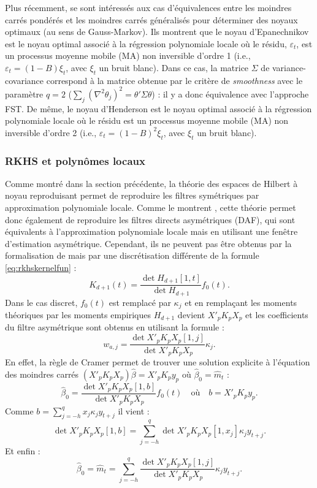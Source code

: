 \documentclass[
  12pt,
  french,
  12pt,a4paper]{article}
\newcommand\1{\mathds{1}}
\begin{document}
Plus récemment, \textcite{LuatiProietti2011} se sont intéressés aux cas d'équivalences entre les moindres carrés pondérés et les moindres carrés généralisés pour déterminer des noyaux optimaux (au sens de Gauss-Markov).
Ils montrent que le noyau d'Epanechnikov est le noyau optimal associé à la régression polynomiale locale où le résidu, \(\varepsilon_t\), est un processus moyenne mobile (MA) non inversible d'ordre 1 (i.e., \(\varepsilon_t=(1-B)\xi_t\), avec \(\xi_t\) un bruit blanc).
Dans ce cas, la matrice \(\Sigma\) de variance-covariance correspond à la matrice obtenue par le critère de \emph{smoothness} avec le paramètre \(q=2\) (\(\sum_{j}(\nabla^{2}\theta_{j})^{2} = \theta'\Sigma\theta\)) : il y a donc équivalence avec l'approche FST.
De même, le noyau d'Henderson est le noyau optimal associé à la régression polynomiale locale où le résidu est un processus moyenne mobile (MA) non inversible d'ordre 2 (i.e., \(\varepsilon_t=(1-B)^2\xi_t\), avec \(\xi_t\) un bruit blanc).

\hypertarget{rkhs-et-polynuxf4mes-locaux}{%
\subsubsection{RKHS et polynômes locaux}\label{rkhs-et-polynuxf4mes-locaux}}

Comme montré dans la section précédente, la théorie des espaces de Hilbert à noyau reproduisant permet de reproduire les filtres symétriques par approximation polynomiale locale.
Comme le montrent \textcite{LuatiProietti2011}, cette théorie permet donc également de reproduire les filtres directs asymétriques (DAF), qui sont équivalents à l'approximation polynomiale locale mais en utilisant une fenêtre d'estimation asymétrique.
Cependant, ils ne peuvent pas être obtenus par la formalisation de \textcite{dagumbianconcini2008} mais par une discrétisation différente de la formule \eqref{eq:rkhskernelfun} :
\[
K_{d+1}(t)=\frac{\det{H_{d+1}[1,t]}}{\det{H_{d+1}}}f_0(t).
\]
Dans le cas discret, \(f_0(t)\) est remplacé par \(\kappa_j\) et en remplaçant les moments théoriques par les moments empiriques \(H_{d+1}\) devient \(X'_pK_pX_p\) et les coefficients du filtre asymétrique sont obtenus en utilisant la formule :
\[
w_{a,j}=\frac{\det{X'_pK_pX_p[1,j]}
}{
\det{X'_pK_pX_p}
}\kappa_j.
\]
En effet, la règle de Cramer permet de trouver une solution explicite à l'équation des moindres carrés \((X'_pK_pX_p)\hat \beta=X'_pK_py_p\) où \(\hat \beta_0=\hat m_t\) :
\[
\hat \beta_0 = \frac{\det{X'_pK_pX_p[1,b]}}{\det{X'_pK_pX_p}}f_0(t)
\quad\text{où}\quad b=X'_pK_py_p.
\]
Comme \(b=\sum_{j=-h}^qx_j\kappa_jy_{t+j}\) il vient :
\[
\det{X'_pK_pX_p[1,b]} = \sum_{j=-h}^q\det{X'_pK_pX_p[1,x_j]}\kappa_jy_{t+j}.
\]
Et enfin :
\[
\hat \beta_0 = \hat m_t= \sum_{j=-h}^q\frac{\det{X'_pK_pX_p[1,j]}
}{
\det{X'_pK_pX_p}
}\kappa_j y_{t+j}.
\]
\end{document}
